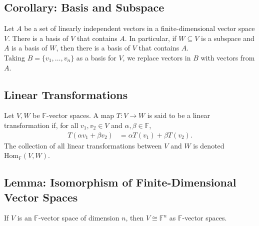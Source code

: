 \documentclass[8pt]{extarticle}
\begin{document}
  \subsection{Corollary: Basis and Subspace}%
  Let $A$ be a set of linearly independent vectors in a finite-dimensional vector space $V$. There is a basis of $V$ that contains $A$. In particular, if $W\subseteq V$ is a subspace and $A$ is a basis of $W$, then there is a basis of $V$ that contains $A$.\\

  Taking $B = \{v_1,\dots,v_n\}$ as a basis for $V$, we replace vectors in $B$ with vectors from $A$.
  \subsection{Linear Transformations}%
  Let $V,W$ be $\mathbb{F}$-vector spaces. A map $T:V\rightarrow W$ is said to be a linear transformation if, for all $v_1,v_2\in V$ and $\alpha,\beta \in \mathbb{F}$,
  \begin{align*}
    T(\alpha v_1 + \beta v_2) &= \alpha T(v_1) + \beta T(v_2).
  \end{align*}
  The collection of all linear transformations between $V$ and $W$ is denoted $\text{Hom}_{\mathbb{F}}(V,W)$.
  \subsection{Lemma: Isomorphism of Finite-Dimensional Vector Spaces}%
  If $V$ is an $\mathbb{F}$-vector space of dimension $n$, then $V\cong \mathbb{F}^{n}$ as $\mathbb{F}$-vector spaces.\\
\end{document}
